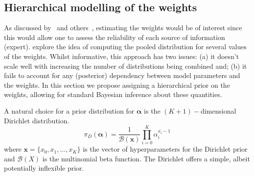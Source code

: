 \documentclass[a4paper, notitlepage, 10pt]{article}
\begin{document}
\subsection{Hierarchical modelling of the weights}
\label{sec:hierPrior}

As discussed by~\cite{poole2000} and others~\citep{zhong2015,li2017}, estimating the weights would be of interest since this would allow one to assess the reliability of each source of information (expert).
\cite{li2017} explore the idea of computing the pooled distribution for several values of the weights.
Whilst informative, this approach has two issues: (a) it doesn't scale well with increasing the number of distributions being combined and; (b) it fails to account for any (posterior) dependency between model parameters and the weights.
In this section we propose assigning a hierarchical prior on the weights, allowing for standard Bayesian inference about these quantities.

A natural choice for a prior distribution for $\boldsymbol\alpha$ is the $(K+1)-$dimensional Dirichlet distribution.
\begin{equation}
 \label{eq:generalcondprior}
 \pi_D(\boldsymbol\alpha) = \frac{1}{\mathcal{B}(\boldsymbol x)}\prod_{i=0}^K \alpha_i^{x_i-1}
\end{equation}
where $\boldsymbol x = \{ x_0, x_1, \ldots, x_K\}$ is the vector of hyperparameters for the Dirichlet prior and $\mathcal{B}(X)$ is the multinomial beta function.
The Dirichlet offers a simple, albeit potentially inflexible prior.
\end{document}

